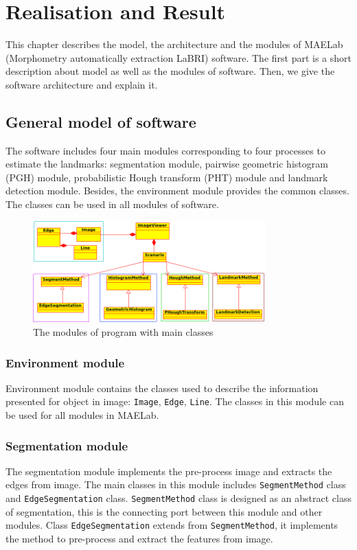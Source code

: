 \chapter{Realisation and Result}
This chapter describes the model, the architecture and the modules of MAELab (Morphometry automatically extraction LaBRI) software. The first part is a short description about model as well as the modules of software. Then, we give the software architecture and explain it.
\section{General model of software}
The software includes four main modules corresponding to four processes to estimate the landmarks: segmentation module, pairwise geometric histogram (PGH) module, probabilistic Hough transform (PHT) module and landmark detection module. Besides, the environment module provides the common classes. The classes can be used in all modules of software.
\begin{figure}[h!]
\centering
\includegraphics[width=0.8\textwidth]{./images/modules}
\caption{The modules of program with main classes}
\label{fig:42}
\end{figure}
\subsection*{Environment module}
Environment module contains the classes used to describe the information presented for object in image: \texttt{Image}, \texttt{Edge}, \texttt{Line}. The classes in this module can be used for all modules in MAELab.
\subsection{Segmentation module}
The segmentation module implements the pre-process image and extracts the edges from image. The main classes in this module includes \texttt{SegmentMethod} class and \texttt{EdgeSegmentation} class. \texttt{SegmentMethod} class is designed as an abstract class of segmentation, this is the connecting port between this module and other modules. Class \texttt{EdgeSegmentation} extends from \texttt{SegmentMethod}, it implements the method to pre-process and extract the features from image. 
